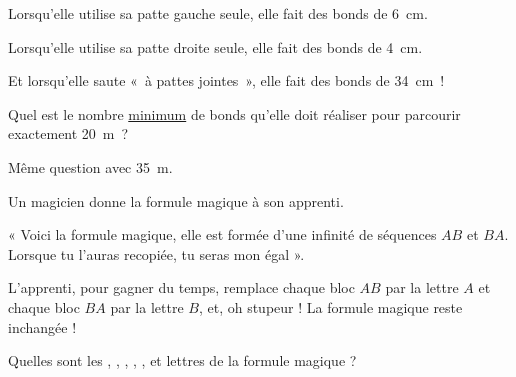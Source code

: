 \begin{enigme}

Lorsqu'elle utilise sa patte gauche seule, elle fait des bonds de 6 cm.

Lorsqu'elle utilise sa patte droite seule, elle fait des bonds de 4 cm.

Et lorsqu'elle saute « à pattes jointes », elle fait des bonds de 34 cm !

Quel est le nombre \underline{minimum} de bonds qu'elle doit réaliser pour parcourir exactement 20 m ?

Même question avec 35 m.
 
 \end{enigme}
 
 \vspace*{2em}
 

\begin{enigme}[Abracadabra]

Un magicien donne la formule magique à son apprenti.

« Voici la formule magique, elle est formée d'une infinité de séquences $AB$ et $BA$. Lorsque tu l'auras recopiée, tu seras mon égal ».

L'apprenti, pour gagner du temps, remplace chaque bloc $AB$ par la lettre $A$ et chaque bloc $BA$ par la lettre $B$, et, oh stupeur ! La formule magique reste inchangée !

Quelles sont les , , , , ,  et  lettres de la formule magique ?

\end{enigme} 

